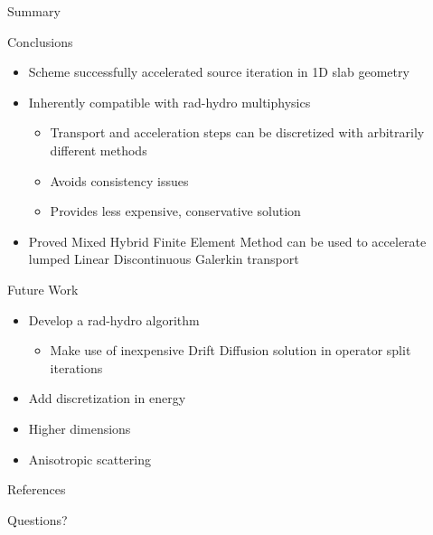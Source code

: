 \documentclass[10pt]{beamer}
\begin{document}
\begin{frame}{Summary}

    Conclusions
    \begin{itemize}

        \item Scheme successfully accelerated source iteration in 1D slab geometry 

        \item Inherently compatible with rad-hydro multiphysics 

        \begin{itemize}
            \item Transport and acceleration steps can be discretized with arbitrarily different methods 
            \item Avoids consistency issues 
            \item Provides less expensive, conservative solution 
        \end{itemize}

        \item Proved Mixed Hybrid Finite Element Method can be used to accelerate lumped Linear Discontinuous Galerkin transport 

    \end{itemize}

    Future Work 
    \begin{itemize}
        \item Develop a rad-hydro algorithm 

        \begin{itemize}
            \item Make use of inexpensive Drift Diffusion solution in operator split iterations 
        \end{itemize}

        \item Add discretization in energy 

        \item Higher dimensions 

        \item Anisotropic scattering 

    \end{itemize}

\end{frame}

\appendix

\begin{frame}{References}

    \nocite{adams,morel,llnl,alcouffe,mhfem,hydro}
    \small
    
    

\end{frame}

\begin{frame}[standout]
  Questions?
\end{frame}
\end{document}
